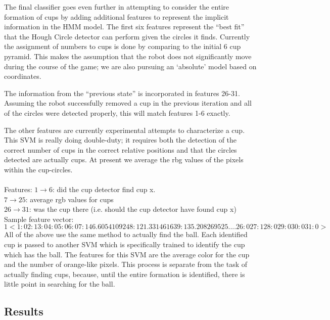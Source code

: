 \documentclass[letterpaper, 10 pt, conference]{ieeeconf}  %
\begin{document}
The final classifier goes even further in attempting to consider the entire formation of cups by adding additional features to represent the implicit information in the HMM model.  The first six features represent the “best fit” that the Hough Circle detector can perform given the circles it finds.  Currently the assignment of numbers to cups is done by comparing to the initial 6 cup pyramid.  This makes the assumption that the robot does not significantly move during the course of the game; we are also pursuing an ‘absolute’ model based on coordinates.
    
The information from the “previous state” is incorporated in features 26-31.  Assuming the robot successfully removed a cup in the previous iteration and all of the circles were detected properly, this will match features 1-6 exactly.

The other features are currently experimental attempts to characterize a cup.  This SVM is really doing double-duty; it requires both the detection of the correct number of cups in the correct relative positions and that the circles detected are actually cups.  At present we average the rbg values of the pixels within the cup-circles.\\\\
Features: 
$1 \rightarrow 6$: did the cup detector find cup x. \\
$7 \rightarrow 25$: average rgb values for cups\\
$26 \rightarrow 31$: was the cup there (i.e. should the cup detector have found cup x)\\

Sample feature vector:\\

$1  <1:0 2:1 3:0 4:0 5:0 6:0 7:146.605410924 8:121.33146163 9:135.208269525 .... 26:0 27:1 28:0 29:0 30:0 31:0>$ \\


All of the above use the same method to actually find the ball.  Each identified cup is passed to another SVM which is specifically trained to identify the cup which has the ball.  The features for this SVM are the average color for the cup and the number of orange-like pixels.  This process is separate from the task of actually finding cups, because, until the entire formation is identified, there is little point in searching for the ball.

\subsection{Results}
\end{document}

